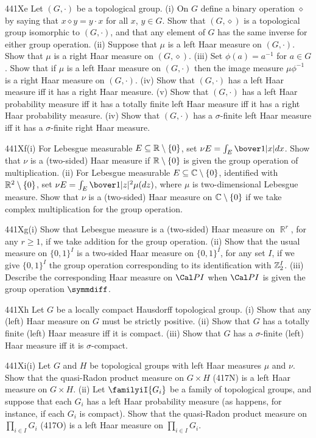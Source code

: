 {\spheader 441Xe Let $(G,\cdot)$ be a topological group.   (i) On $G$
define a binary operation
$\diamond$ by saying that $x\diamond y=y\cdot x$ for all $x$,
$y\in G$.   Show that $(G,\diamond)$ is a topological group isomorphic
to $(G,\cdot)$, and that any element of $G$ has the same inverse for
either group operation.   (ii) Suppose that $\mu$
is a left Haar measure on $(G,\cdot)$.   Show that $\mu$ is a right Haar
measure on $(G,\diamond)$.   (iii) Set $\phi(a)=a^{-1}$ for
$a\in G$.   Show that if $\mu$ is a left Haar measure on $(G,\cdot)$ then
the image measure
$\mu\phi^{-1}$ is a right Haar measure on $(G,\cdot)$.   (iv)
Show that $(G,\cdot)$ has a left Haar measure iff it has a right Haar
measure.
(v) Show that $(G,\cdot)$ has a left Haar probability measure iff it has
a totally finite left Haar measure iff it has a right Haar probability
measure.   (iv) Show that $(G,\cdot)$ has a $\sigma$-finite left Haar
measure iff it has a $\sigma$-finite right Haar measure.

\sqheader 441Xf(i) For Lebesgue measurable
$E\subseteq\Bbb R\setminus\{0\}$, set $\nu E=\int_E\bover1{|x|}dx$.
Show that $\nu$ is
a (two-sided) Haar measure if $\Bbb R\setminus\{0\}$ is given the group
operation of multiplication.   (ii) For Lebesgue measurable
$E\subseteq\Bbb C\setminus\{0\}$, identified with
$\Bbb R^2\setminus\{0\}$, set $\nu E=\int_E\bover1{|z|^2}\mu(dz)$, where
$\mu$ is two-dimensional Lebesgue measure.   Show that $\nu$ is a
(two-sided)
Haar measure on $\Bbb C\setminus\{0\}$ if we take complex multiplication
for the group operation.   

\sqheader 441Xg(i) Show that Lebesgue measure is a (two-sided) Haar
measure on $\BbbR^r$, for any $r\ge 1$, if we take addition for the
group operation.   (ii) Show that the usual measure on $\{0,1\}^I$ is a
two-sided Haar measure on $\{0,1\}^I$, for any set $I$, if we give
$\{0,1\}^I$ the group operation corresponding to its identification with
$\Bbb Z_2^I$.   (iii) Describe the corresponding Haar measure on
$\Cal PI$ when $\Cal PI$ is given the group operation $\symmdiff$.

\spheader 441Xh Let $G$ be a locally compact Hausdorff topological
group.   (i) Show that any (left) Haar measure on $G$ must be strictly
positive.   (ii) Show that $G$ has a totally finite (left) Haar measure
iff it is compact.   (iii) Show that $G$ has a $\sigma$-finite (left)
Haar measure iff it is $\sigma$-compact.

\sqheader 441Xi(i) Let $G$ and $H$ be topological groups with left Haar
measures $\mu$ and $\nu$.   Show that the quasi-Radon product measure on
$G\times H$ (417N) is a left Haar measure on $G\times H$.   (ii) Let
$\familyiI{G_i}$ be a family of topological groups, and suppose that
each $G_i$ has a left Haar probability measure (as happens, for
instance, if each $G_i$ is compact).   Show that the quasi-Radon product
measure on $\prod_{i\in I}G_i$ (417O) is a left Haar measure on
$\prod_{i\in I}G_i$.

}
